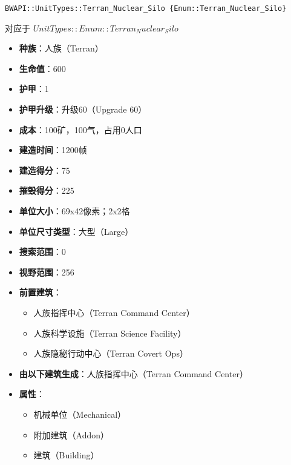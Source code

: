 \begin{tcolorbox}[colback=white, colframe=black!60!white, title=Terran\_Nuclear\_Silo(), arc=0mm]
    \begin{verbatim}
BWAPI::UnitTypes::Terran_Nuclear_Silo {Enum::Terran_Nuclear_Silo}
    \end{verbatim}
    对应于  $ UnitTypes::Enum::Terran_Nuclear_Silo $ 
    \begin{itemize}
        \item \textbf{种族}：人族（Terran）
        \item \textbf{生命值}：600
        \item \textbf{护甲}：1
        \item \textbf{护甲升级}：升级60（Upgrade 60）
        \item \textbf{成本}：100矿，100气，占用0人口
        \item \textbf{建造时间}：1200帧
        \item \textbf{建造得分}：75
        \item \textbf{摧毁得分}：225
        \item \textbf{单位大小}：69x42像素；2x2格
        \item \textbf{单位尺寸类型}：大型（Large）
        \item \textbf{搜索范围}：0
        \item \textbf{视野范围}：256
        \item \textbf{前置建筑}：
            \begin{itemize}
                \item 人族指挥中心（Terran Command Center）
                \item 人族科学设施（Terran Science Facility）
                \item 人族隐秘行动中心（Terran Covert Ops）
            \end{itemize}
        \item \textbf{由以下建筑生成}：人族指挥中心（Terran Command Center）
        \item \textbf{属性}：
            \begin{itemize}
                \item 机械单位（Mechanical）
                \item 附加建筑（Addon）
                \item 建筑（Building）
            \end{itemize}
    \end{itemize} 
\end{tcolorbox}

